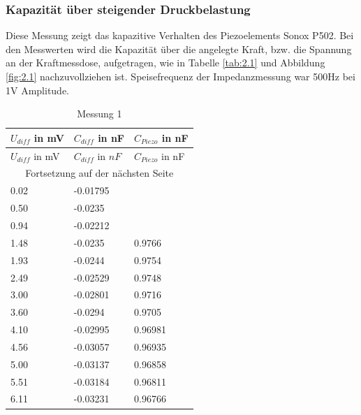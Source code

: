 \documentclass[12pt]{scrreprt} %
\begin{document}
\subsubsection{Kapazität über steigender Druckbelastung}
Diese Messung zeigt das kapazitive Verhalten des Piezoelements Sonox P502. Bei den Messwerten wird die Kapazität über die angelegte Kraft, bzw. die Spannung an der Kraftmessdose, aufgetragen, wie in Tabelle \vref{tab:2.1} und Abbildung \vref{fig:2.1} nachzuvollziehen ist. Speisefrequenz der Impedanzmessung war 500Hz bei 1V Amplitude.
\setlongtables
\begin{longtable}{| l | l | l |}
\caption{Messung 1}\\
\hline
$U_{diff}$ in mV&$C_{diff}$ in nF&$C_{Piezo}$ in nF\\
\hline
\endfirsthead
\hline
$U_{diff}$ in mV&$C_{diff}$ in $nF$&$C_{Piezo}$ in nF\\
\hline
\endhead
\hline
\multicolumn{3}{|c|}{Fortsetzung auf der nächsten Seite}\\
\hline
\endfoot
\hline \hline
\endlastfoot
\hline
\label{tab:2.1}%
0.02&-0.01795&\\
0.50&-0.0235&\\
0.94&-0.02212&\\
1.48&-0.0235&0.9766\\
1.93&-0.0244&0.9754\\
2.49&-0.02529&0.9748\\
3.00&-0.02801&0.9716\\
3.60&-0.0294&0.9705\\
4.10&-0.02995&0.96981\\
4.56&-0.03057&0.96935\\
5.00&-0.03137&0.96858\\
5.51&-0.03184&0.96811\\
6.11&-0.03231&0.96766\\
\end{longtable}
\end{document}
